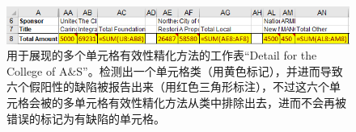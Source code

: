 \begin{figure}[tbp]
    \centering
    \includegraphics[width=\columnwidth]{figure/figure3.png}
    \caption{用于展现\wa 的多个单元格有效性精化方法的工作表``Detail for the College of A\&S''。\cu 检测出一个单元格类（用黄色标记），并进而导致六个假阳性的缺陷被报告出来（用红色三角形标注），不过这六个单元格会被\wa 的多单元格有效性精化方法从类中排除出去，进而不会再被错误的标记为有缺陷的单元格。}
    \label{figure3}
\end{figure}